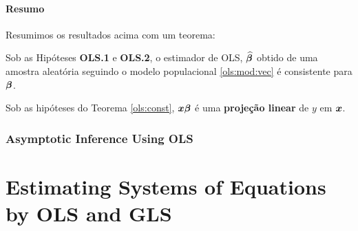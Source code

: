 \documentclass[11pt, oneside, a4paper, article]{article}
\numberwithin{equation}{section}
\begin{document}
\paragraph{Resumo}
Resumimos os resultados acima com um teorema:

\begin{teo1}\label{ols:const}
Sob as Hipóteses \textbf{OLS.1} e \textbf{OLS.2}, o estimador de OLS, $\widehat{\boldsymbol{\beta}}$ obtido de uma amostra aleatória seguindo o modelo populacional \eqref{ols:mod:vec} é consistente para $\boldsymbol{\beta}$.
\end{teo1}

Sob as hipóteses do Teorema \ref{ols:const}, $\boldsymbol{x} \boldsymbol{\beta}$ é uma \textbf{projeção linear} de $y$ em $\boldsymbol{x}$.

\subsubsection{Asymptotic Inference Using OLS}
\noindent
\citet[Sec. 4.2.2 -- Asymptotic INference Using OLS; p.54-5]{wool-2010}

\clearpage
\section{Estimating Systems of Equations by OLS and GLS}

\noindent
\citet[C.7,  p.143--179]{wool-2010}\\
\end{document}

